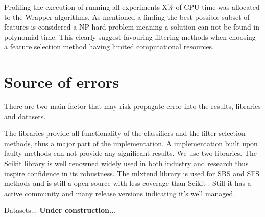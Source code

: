 Profiling the execution of running all experiments X\% of CPU-time was allocated to the Wrapper algorithms. As mentioned a finding the best possible subset of features is considered a NP-hard problem meaning a solution can not be found in polynomial time. This clearly suggest favouring filtering methods when choosing a feature selection method having limited computational resources.

\section{Source of errors}
\label{sec:source_of_errors}

There are two main factor that may risk propagate error into the results, libraries and datasets.

The libraries provide all functionality of the classifiers and the filter selection methods, thus a major part of the implementation. A implementation built upon faulty methods can not provide any significant results. We use two libraries. The Scikit library \parencite{scikit-learn} is well renowned widely used in both industry and research thus inspire confidence in its robustness. The mlxtend library is used for SBS and SFS methods and is still a open source with less coverage than Scikit \parencite{mlextend}. Still it has a active community and many release versions indicating it's well managed.

Datasets... \textbf{Under construction...}

